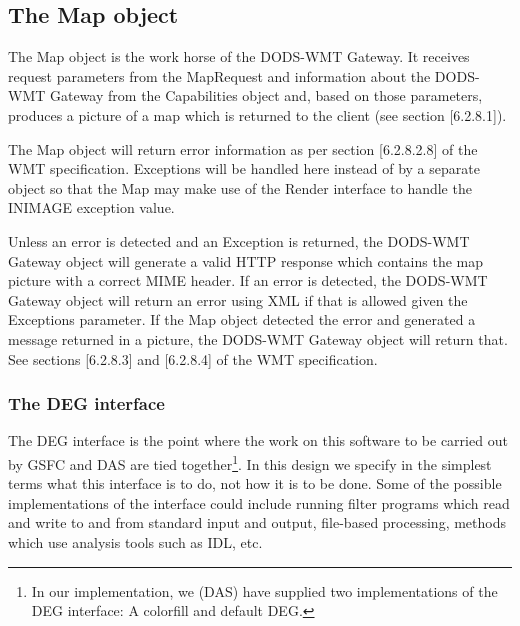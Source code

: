 \documentclass{article}
\begin{document}
\subsection{The Map object}
\label{sec:map}


The Map object is the work horse of the DODS-WMT Gateway. It receives request
parameters from the MapRequest and information about the DODS-WMT
Gateway from the Capabilities object and, based on those parameters,
produces a picture of a map which is returned to the client (see section
[6.2.8.1]).

The Map object will return error information as per section [6.2.8.2.8] of
the WMT specification. Exceptions will be handled here instead of by a
separate object so that the Map may make use of the Render interface to
handle the INIMAGE exception value.

Unless an error is detected and an Exception is returned, the DODS-WMT
Gateway object will generate a valid HTTP response which contains the map
picture with a correct MIME header. If an error is detected, the DODS-WMT
Gateway object will return an error using XML if that is allowed given the
Exceptions parameter. If the Map object detected the error and generated a
message returned in a picture, the DODS-WMT Gateway object will return that.
See sections [6.2.8.3] and [6.2.8.4] of the WMT specification.



\subsubsection{The DEG interface}
The DEG interface is the point where the work on this software to be carried
out by GSFC and DAS are tied together\footnote{In our implementation, we
  (DAS) have supplied two implementations of the DEG interface: A colorfill
  and default DEG.}. In this design we specify in the
simplest terms what this interface is to do, not how it is to be done. Some
of the possible implementations of the interface could include running filter
programs which read and write to and from standard input and output,
file-based processing, methods which use analysis tools such as IDL, etc.
\end{document}
